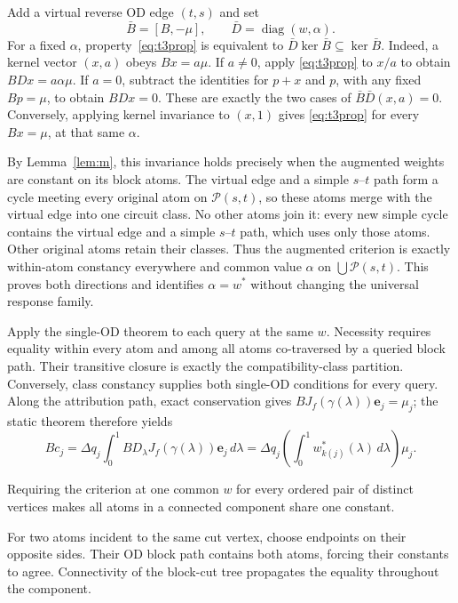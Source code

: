 \begin{pf}
Add a virtual reverse OD edge $(t,s)$ and set
\[
\bar B=[B,-\mu],\qquad \bar D=\operatorname{diag}(w,\alpha).
\]
For a fixed $\alpha$, property~\eqref{eq:t3prop} is equivalent to
$\bar D\ker\bar B\subseteq\ker\bar B$.
Indeed, a kernel vector $(x,a)$ obeys $Bx=a\mu$. If $a\ne0$,
apply \eqref{eq:t3prop} to $x/a$ to obtain $BDx=a\alpha\mu$.
If $a=0$, subtract the identities for $p+x$ and $p$, with any fixed
$Bp=\mu$, to obtain $BDx=0$. These are exactly the two cases of
$\bar B\bar D(x,a)=0$. Conversely, applying kernel invariance to
$(x,1)$ gives \eqref{eq:t3prop} for every $Bx=\mu$, at that same $\alpha$.

By Lemma~\ref{lem:m}, this invariance holds precisely when the augmented
weights are constant on its block atoms. The virtual edge and a simple
$s$--$t$ path form a cycle meeting every original atom on
$\mathcal P(s,t)$, so these atoms merge with the virtual edge into one
circuit class. No other atoms join it: every new simple cycle contains
the virtual edge and a simple $s$--$t$ path, which uses only those
atoms. Other original atoms retain their classes. Thus the augmented
criterion is exactly within-atom constancy everywhere and common value
$\alpha$ on $\bigcup\mathcal P(s,t)$. This proves both directions and
identifies $\alpha=w^*$ without changing the universal response family.
\end{pf}

\begin{pf}
Apply the single-OD theorem to each query at the same $w$. Necessity
requires equality within every atom and among all atoms co-traversed
by a queried block path. Their transitive closure is exactly the
compatibility-class partition. Conversely, class constancy supplies
both single-OD conditions for every query. Along the attribution
path, exact conservation gives $BJ_f(\gamma(\lambda))\mathbf e_j=\mu_j$;
the static theorem therefore yields
\[
Bc_j=\Delta q_j\int_0^1
BD_\lambda J_f(\gamma(\lambda))\mathbf e_j\,d\lambda
=\Delta q_j\left(\int_0^1w^*_{k(j)}(\lambda)\,d\lambda\right)\mu_j.
\]
\end{pf}

\begin{corollary}\label{cor:allod}
Requiring the criterion at one common $w$ for every ordered pair of
distinct vertices makes all atoms in a connected component share one
constant.
\end{corollary}
\begin{pf}
For two atoms incident to the same cut vertex, choose endpoints on
their opposite sides. Their OD block path contains both atoms, forcing
their constants to agree. Connectivity of the block-cut tree propagates
the equality throughout the component.
\end{pf}

